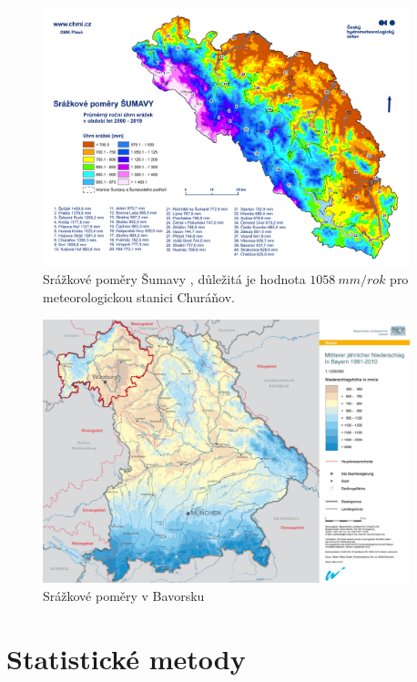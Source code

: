 \begin{figure}
	\centering
	\includegraphics[width=0.95\textwidth]{img/ch1/srazkovepomerysumava.png}
	\caption{Srážkové poměry Šumavy \parencite{srazkovepomerysumava}, důležitá je hodnota $\SI{1058}{mm/rok}$ pro meteorologickou stanici Churáňov.}
	\label{fig:srazkovepomerysumava}
\end{figure}

\begin{figure}
	\centering
	\includegraphics[width=0.95\textwidth]{img/ch1/srazkovepomerybavorskyles.png}
	\caption{Srážkové poměry v Bavorsku \parencite{srazkovepomerybavorskyles}}
	\label{fig:srazkovepomerybavorskyles}
\end{figure}

\clearpage

\section{Statistické metody}\label{chap:statistika}

